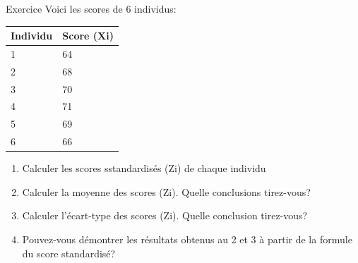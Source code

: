 \documentclass[
  ignorenonframetext,
]{beamer}
\providecommand{\tightlist}{%
  \setlength{\itemsep}{0pt}\setlength{\parskip}{0pt}}
\begin{document}
\begin{frame}{Exercice}
\protect\hypertarget{exercice}{}
Voici les scores de 6 individus:

\begin{longtable}[]{@{}ll@{}}
\toprule()
Individu & Score (Xi) \\
\midrule()
\endhead
1 & 64 \\
2 & 68 \\
3 & 70 \\
4 & 71 \\
5 & 69 \\
6 & 66 \\
\bottomrule()
\end{longtable}

\begin{enumerate}
\tightlist
\item
  Calculer les scores sstandardisés (Zi) de chaque individu
\item
  Calculer la moyenne des scores (Zi). Quelle conclusions tirez-vous?
\item
  Calculer l'écart-type des scores (Zi). Quelle conclusion tirez-vous?
\item
  Pouvez-vous démontrer les résultats obtenus au 2 et 3 à partir de la
  formule du score standardisé?
\end{enumerate}
\end{frame}
\end{document}
